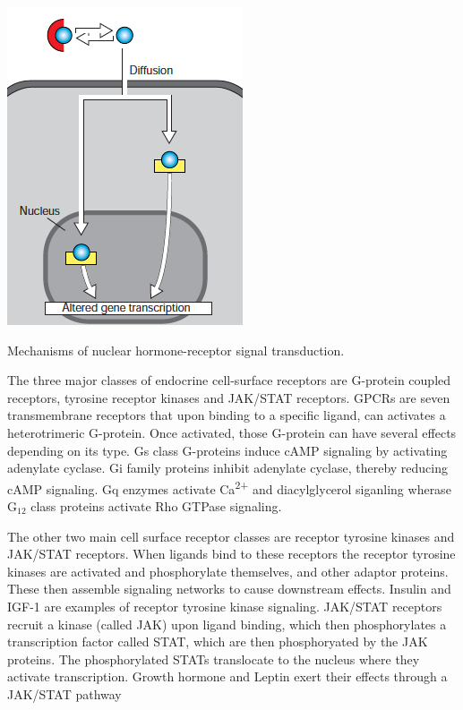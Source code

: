 \documentclass{tufte-handout}
\begin{document}
\begin{marginfigure}[-8cm]
  \includegraphics{figures/nuclear-hormone-receptors}
  \caption{Mechanisms of nuclear hormone-receptor signal transduction.}
    \label{fig:nuclear-hormone-receptors}
\end{marginfigure}

The three major classes of endocrine cell-surface receptors are G-protein coupled receptors, tyrosine receptor kinases and JAK/STAT receptors.  GPCRs are seven transmembrane receptors that upon binding to a specific ligand, can activates a heterotrimeric G-protein.  Once activated, those G-protein can have several effects depending on its type.  Gs class G-proteins induce cAMP signaling by activating adenylate cyclase.  Gi family proteins inhibit adenylate cyclase, thereby reducing cAMP signaling.  Gq enzymes activate Ca\textsuperscript{2+} and diacylglycerol siganling wherase G$_{12}$ class proteins activate Rho GTPase signaling.

The other two main cell surface receptor classes are receptor tyrosine kinases and JAK/STAT receptors.  When ligands bind to these receptors the receptor tyrosine kinases are activated and phosphorylate themselves, and other adaptor proteins.  These then assemble signaling networks to cause downstream effects.  Insulin and IGF-1 are examples of receptor tyrosine kinase signaling.  JAK/STAT receptors recruit a kinase (called JAK) upon ligand binding, which then phosphorylates a transcription factor called STAT, which are then phosphoryated by the JAK proteins.  The phosphorylated STATs translocate to the nucleus where they activate transcription.  Growth hormone and Leptin exert their effects through a JAK/STAT pathway
\end{document}
